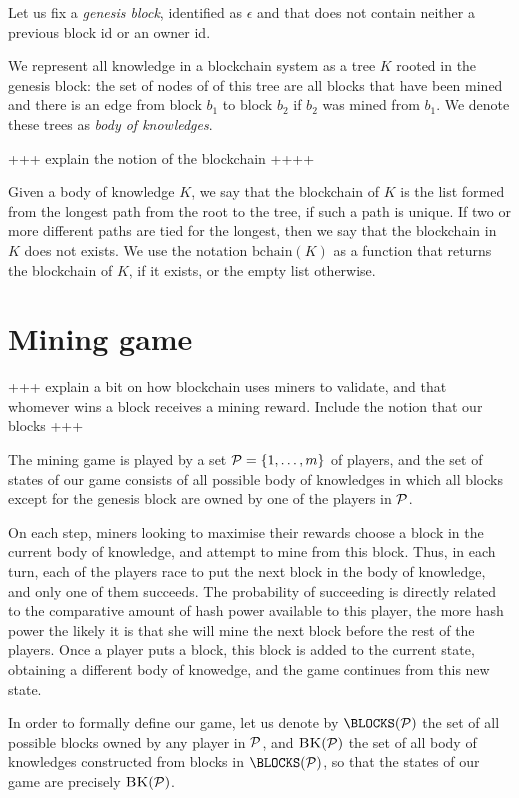\documentclass{article}
\newcommand{\bchain}{\text{bchain}}
\newcommand{\body}{K}
\begin{document}
Let us fix a \emph{genesis block}, identified as $\epsilon$ and that does not contain neither a previous block id or an owner id. 

We represent all knowledge in a blockchain system as a tree $\body$ rooted in the genesis block: the set of nodes of of this tree are all blocks that have been mined and there is an edge from block $b_1$ to block $b_2$ if $b_2$ was mined from $b_1$. We denote these trees as \emph{body of knowledges}. 

+++ explain the notion of the blockchain ++++  


Given a body of knowledge $\body$, we say that the blockchain of $\body$ is the list formed from the longest path from the root to the tree, 
if such a path is unique. If two or more different paths are tied for the longest, then we say that the blockchain in $\body$ does not exists. 
We use the notation $\bchain(\body)$ as a function that returns the blockchain of $\body$, if it exists, or the empty list otherwise. 


\section{Mining game}

+++ explain a bit on how blockchain uses miners to validate, and that whomever wins a block receives a mining reward. 
Include the notion that our blocks  +++

The mining game is played by a set $\mathcal{P} = \{1, \ldots, m\}$ of players, and the set of states of our game consists of all possible body of knowledges in which all blocks except for the genesis block are owned by one of the players in $\mathcal{P}$. 

On each step, miners looking to maximise their rewards choose a block in the current body of knowledge, and attempt to mine from this block. Thus, in each turn, each of the players race to put the next block in the body of knowledge, and only one of them succeeds. The probability of succeeding is directly related to the comparative amount of hash power available to this player, the more hash power the likely it is that she will mine the next block before the rest of the players. Once a player puts a block, this block is added to the current state, obtaining a different body of knowedge, and the game continues from this new state. 

In order to formally define our game, let us denote by $\BLOCKS(\cP)$ the set of all possible blocks owned by any player in $\mathcal{P}$, and 
$\text{\sc BK}(\mathcal{P})$ the set of all body of knowledges constructed from blocks in $\BLOCKS(\cP)$, so that the states of our game are precisely 
$\text{\sc BK}(\mathcal{P})$. 
\end{document}

